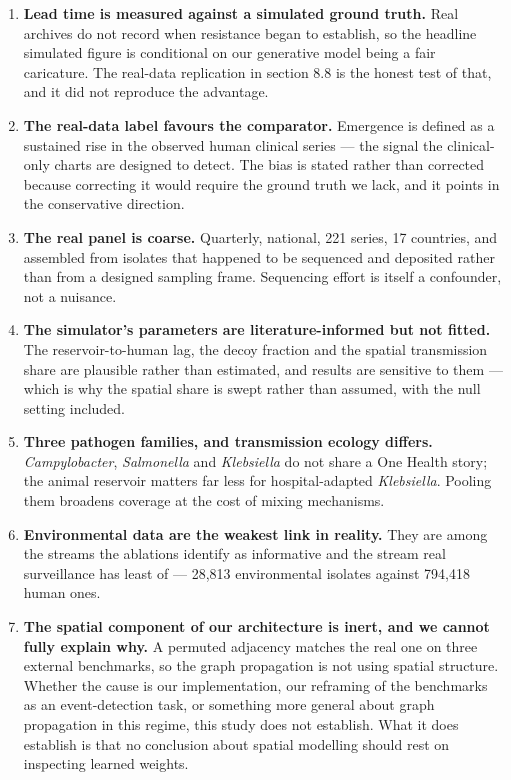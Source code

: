 \documentclass[11pt,a4paper]{article}
\begin{document}
\begin{enumerate}[leftmargin=1.3em,itemsep=2pt]
  \item \textbf{Lead time is measured against a simulated ground truth.} Real archives do not record when resistance began to establish, so the headline simulated figure is conditional on our generative model being a fair caricature. The real-data replication in section 8.8 is the honest test of that, and it did not reproduce the advantage.
  \item \textbf{The real-data label favours the comparator.} Emergence is defined as a sustained rise in the observed human clinical series — the signal the clinical-only charts are designed to detect. The bias is stated rather than corrected because correcting it would require the ground truth we lack, and it points in the conservative direction.
  \item \textbf{The real panel is coarse.} Quarterly, national, 221 series, 17 countries, and assembled from isolates that happened to be sequenced and deposited rather than from a designed sampling frame. Sequencing effort is itself a confounder, not a nuisance.
  \item \textbf{The simulator's parameters are literature-informed but not fitted.} The reservoir-to-human lag, the decoy fraction and the spatial transmission share are plausible rather than estimated, and results are sensitive to them — which is why the spatial share is swept rather than assumed, with the null setting included.
  \item \textbf{Three pathogen families, and transmission ecology differs.} \emph{Campylobacter}, \emph{Salmonella} and \emph{Klebsiella} do not share a One Health story; the animal reservoir matters far less for hospital-adapted \emph{Klebsiella}. Pooling them broadens coverage at the cost of mixing mechanisms.
  \item \textbf{Environmental data are the weakest link in reality.} They are among the streams the ablations identify as informative and the stream real surveillance has least of — 28,813 environmental isolates against 794,418 human ones.
  \item \textbf{The spatial component of our architecture is inert, and we cannot fully explain why.} A permuted adjacency matches the real one on three external benchmarks, so the graph propagation is not using spatial structure. Whether the cause is our implementation, our reframing of the benchmarks as an event-detection task, or something more general about graph propagation in this regime, this study does not establish. What it does establish is that no conclusion about spatial modelling should rest on inspecting learned weights.

\end{enumerate}
\end{document}
